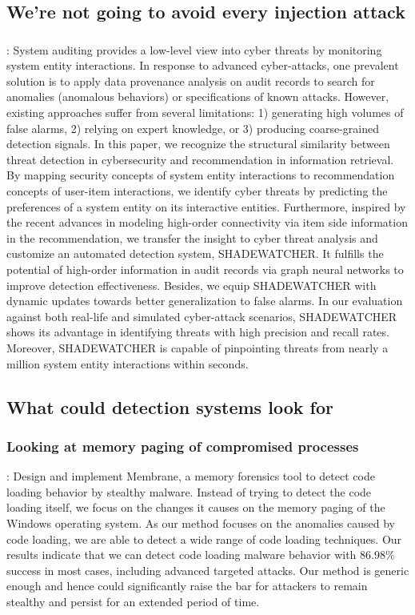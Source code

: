 \documentclass{article}
\begin{document}
\subsection{We're not going to avoid every injection attack}

\subsubsection{\textcite{Zengy:2022}}
\textbf{}:  System auditing provides a low-level view into cyber threats by monitoring system entity interactions. In response to advanced cyber-attacks, one prevalent solution is to apply data provenance analysis on audit records to search for anomalies (anomalous behaviors) or specifications of known attacks. However, existing approaches suffer from several limitations: 1) generating high volumes of false alarms, 2) relying on expert knowledge, or 3) producing coarse-grained detection signals. In this paper, we recognize the structural similarity between threat detection in cybersecurity and recommendation in information retrieval. By mapping security concepts of system entity interactions to recommendation concepts of user-item interactions, we identify cyber threats by predicting the preferences of a system entity on its interactive entities. Furthermore, inspired by the recent advances in modeling high-order connectivity via item side information in the recommendation, we transfer the insight to cyber threat analysis and customize an automated detection system, SHADEWATCHER. It fulfills the potential of high-order information in audit records via graph neural networks to improve detection effectiveness. Besides, we equip SHADEWATCHER with dynamic updates towards better generalization to false alarms. In our evaluation against both real-life and simulated cyber-attack scenarios, SHADEWATCHER shows its advantage in identifying threats with high precision and recall rates. Moreover, SHADEWATCHER is capable of pinpointing threats from nearly a million system entity interactions within seconds.


\subsection{What could detection systems look for}

\subsubsection{\textcite{Pek:2016} Looking at memory paging of compromised processes}
\textbf{}: Design and implement Membrane, a memory forensics tool to detect code loading behavior by stealthy malware. Instead of trying to detect the code loading itself, we focus on the changes it causes on the memory paging of the Windows operating system. As our method focuses on the anomalies caused by code loading, we are able to detect a wide range of code loading techniques. Our results indicate that we can detect code loading malware behavior with 86.98\% success in most cases, including advanced targeted attacks. Our method is generic enough and hence could significantly raise the bar for attackers to remain stealthy and persist for an extended period of time.
\end{document}
